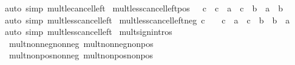 \begin{isabellebody}
\isamarkupfalse%
\ {\isacharparenleft}{\kern0pt}auto\ simp{\isacharcolon}{\kern0pt}\ mult{\isacharunderscore}{\kern0pt}le{\isacharunderscore}{\kern0pt}cancel{\isacharunderscore}{\kern0pt}left{\isacharparenright}{\kern0pt}%
\endisatagproof
{\isafoldproof}%
%
\isadelimproof
\isanewline
%
\endisadelimproof
\isanewline
{}\isamarkupfalse%
\ mult{\isacharunderscore}{\kern0pt}less{\isacharunderscore}{\kern0pt}cancel{\isacharunderscore}{\kern0pt}left{\isacharunderscore}{\kern0pt}pos{\isacharcolon}{\kern0pt}\ {\isachardoublequoteopen}{}\ {\isacharless}{\kern0pt}\ c\ {\isasymLongrightarrow}\ c\ {\isacharasterisk}{\kern0pt}\ a\ {\isacharless}{\kern0pt}\ c\ {\isacharasterisk}{\kern0pt}\ b\ {\isasymlongleftrightarrow}\ a\ {\isacharless}{\kern0pt}\ b{\isachardoublequoteclose}\isanewline
%
\isadelimproof
\ \ %
\endisadelimproof
%
\isatagproof
{}\isamarkupfalse%
\ {\isacharparenleft}{\kern0pt}auto\ simp{\isacharcolon}{\kern0pt}\ mult{\isacharunderscore}{\kern0pt}less{\isacharunderscore}{\kern0pt}cancel{\isacharunderscore}{\kern0pt}left{\isacharparenright}{\kern0pt}%
\endisatagproof
{\isafoldproof}%
%
\isadelimproof
\isanewline
%
\endisadelimproof
\isanewline
{}\isamarkupfalse%
\ mult{\isacharunderscore}{\kern0pt}less{\isacharunderscore}{\kern0pt}cancel{\isacharunderscore}{\kern0pt}left{\isacharunderscore}{\kern0pt}neg{\isacharcolon}{\kern0pt}\ {\isachardoublequoteopen}c\ {\isacharless}{\kern0pt}\ {}\ {\isasymLongrightarrow}\ c\ {\isacharasterisk}{\kern0pt}\ a\ {\isacharless}{\kern0pt}\ c\ {\isacharasterisk}{\kern0pt}\ b\ {\isasymlongleftrightarrow}\ b\ {\isacharless}{\kern0pt}\ a{\isachardoublequoteclose}\isanewline
%
\isadelimproof
\ \ %
\endisadelimproof
%
\isatagproof
{}\isamarkupfalse%
\ {\isacharparenleft}{\kern0pt}auto\ simp{\isacharcolon}{\kern0pt}\ mult{\isacharunderscore}{\kern0pt}less{\isacharunderscore}{\kern0pt}cancel{\isacharunderscore}{\kern0pt}left{\isacharparenright}{\kern0pt}%
\endisatagproof
{\isafoldproof}%
%
\isadelimproof
\isanewline
%
\endisadelimproof
\isanewline
{}\isamarkupfalse%
\isanewline
\isanewline
{}\isamarkupfalse%
\ mult{\isacharunderscore}{\kern0pt}sign{\isacharunderscore}{\kern0pt}intros\ {\isacharequal}{\kern0pt}\isanewline
\ \ mult{\isacharunderscore}{\kern0pt}nonneg{\isacharunderscore}{\kern0pt}nonneg\ mult{\isacharunderscore}{\kern0pt}nonneg{\isacharunderscore}{\kern0pt}nonpos\isanewline
\ \ mult{\isacharunderscore}{\kern0pt}nonpos{\isacharunderscore}{\kern0pt}nonneg\ mult{\isacharunderscore}{\kern0pt}nonpos{\isacharunderscore}{\kern0pt}nonpos\isanewline

\end{isabellebody}
